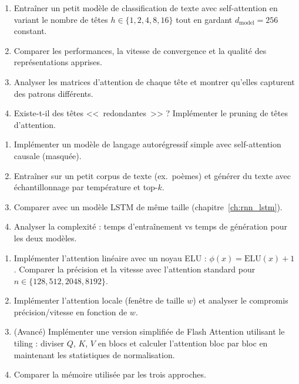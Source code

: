\begin{exercice}
\begin{enumerate}
  \item Entra\^iner un petit mod\`ele de classification de texte avec
    self-attention en variant le nombre de t\^etes $h \in \{1, 2, 4, 8, 16\}$
    tout en gardant $d_{\text{model}} = 256$ constant.
  \item Comparer les performances, la vitesse de convergence et la qualit\'e
    des repr\'esentations apprises.
  \item Analyser les matrices d'attention de chaque t\^ete et montrer qu'elles
    capturent des patrons diff\'erents.
  \item Existe-t-il des t\^etes <<~redondantes~>> ? Impl\'ementer le pruning
    de t\^etes d'attention.
\end{enumerate}
\end{exercice}

\begin{exercice}
\begin{enumerate}
  \item Impl\'ementer un mod\`ele de langage autor\'egressif simple avec
    self-attention causale (masqu\'ee).
  \item Entra\^iner sur un petit corpus de texte (ex.\ po\`emes) et g\'en\'erer
    du texte avec \'echantillonnage par temp\'erature et top-$k$.
  \item Comparer avec un mod\`ele LSTM de m\^eme taille
    (chapitre~\ref{ch:rnn_lstm}).
  \item Analyser la complexit\'e : temps d'entra\^inement vs temps de
    g\'en\'eration pour les deux mod\`eles.
\end{enumerate}
\end{exercice}

\begin{exercice}
\begin{enumerate}
  \item Impl\'ementer l'attention lin\'eaire avec un noyau ELU :
    $\phi(x) = \text{ELU}(x) + 1$. Comparer la pr\'ecision et la vitesse
    avec l'attention standard pour $n \in \{128, 512, 2048, 8192\}$.
  \item Impl\'ementer l'attention locale (fen\^etre de taille $w$) et
    analyser le compromis pr\'ecision/vitesse en fonction de $w$.
  \item (Avanc\'e) Impl\'ementer une version simplifi\'ee de Flash Attention
    utilisant le tiling : diviser $Q$, $K$, $V$ en blocs et calculer
    l'attention bloc par bloc en maintenant les statistiques de normalisation.
  \item Comparer la m\'emoire utilis\'ee par les trois approches.
\end{enumerate}
\end{exercice}
